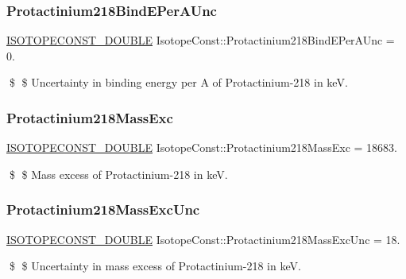 \subsubsection{\texorpdfstring{Protactinium218\+Bind\+E\+Per\+A\+Unc}{Protactinium218BindEPerAUnc}}
{\footnotesize\ttfamily \mbox{\hyperlink{group___isotope_const-_macros_ga8f45a7272ce02c0b4c65c44636ed719a}{I\+S\+O\+T\+O\+P\+E\+C\+O\+N\+S\+T\+\_\+\+D\+O\+U\+B\+LE}} Isotope\+Const\+::\+Protactinium218\+Bind\+E\+Per\+A\+Unc = 0.}

\$ \$ Uncertainty in binding energy per A of Protactinium-\/218 in keV. \mbox{\label{group___isotope_const-_protactinium-_pa218_ga65031de78224e0fe070dc9d942881e3f}} 
\subsubsection{\texorpdfstring{Protactinium218\+Mass\+Exc}{Protactinium218MassExc}}
{\footnotesize\ttfamily \mbox{\hyperlink{group___isotope_const-_macros_ga8f45a7272ce02c0b4c65c44636ed719a}{I\+S\+O\+T\+O\+P\+E\+C\+O\+N\+S\+T\+\_\+\+D\+O\+U\+B\+LE}} Isotope\+Const\+::\+Protactinium218\+Mass\+Exc = 18683.}

\$ \$ Mass excess of Protactinium-\/218 in keV. \mbox{\label{group___isotope_const-_protactinium-_pa218_gaaadc2e4139b643a339886bd16f6bdf92}} 
\subsubsection{\texorpdfstring{Protactinium218\+Mass\+Exc\+Unc}{Protactinium218MassExcUnc}}
{\footnotesize\ttfamily \mbox{\hyperlink{group___isotope_const-_macros_ga8f45a7272ce02c0b4c65c44636ed719a}{I\+S\+O\+T\+O\+P\+E\+C\+O\+N\+S\+T\+\_\+\+D\+O\+U\+B\+LE}} Isotope\+Const\+::\+Protactinium218\+Mass\+Exc\+Unc = 18.}

\$ \$ Uncertainty in mass excess of Protactinium-\/218 in keV. \mbox{\label{group___isotope_const-_protactinium-_pa218_gacc41c9857b9e69d864ebfc5b8549e579}} 
